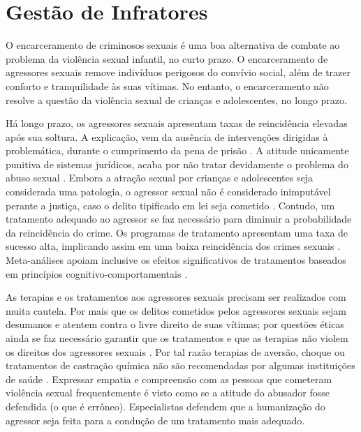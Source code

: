 
\section{Gestão de Infratores}\label{sec:infratores}

O encarceramento de criminosos sexuais é uma boa alternativa de combate ao problema da violência sexual infantil, no curto prazo. O encarceramento de agressores sexuais remove indivíduos perigosos do convívio social, além de trazer conforto e tranquilidade às suas vítimas. No entanto, o encarceramento não resolve a questão da violência sexual de crianças e adolescentes, no longo prazo.  

Há longo prazo, os agressores sexuais apresentam taxas de reincidência elevadas após sua soltura. A explicação, vem da ausência de intervenções dirigidas à problemática, durante o cumprimento da pena de prisão \cite{ribeiro2018programas, finkelhor2009prevention, maia2014castraccao}. A atitude unicamente punitiva de sistemas jurídicos, acaba por não tratar devidamente o problema do abuso sexual \cite{camila2019violencia}. Embora a atração sexual por crianças e adolescentes seja considerada uma patologia, o agressor sexual não é considerado inimputável perante a justiça, caso o delito tipificado em lei seja cometido \cite{ribeiro2018programas}. Contudo, um tratamento adequado ao agressor se faz necessário para diminuir a probabilidade da reincidência do crime. Os programas de tratamento apresentam uma taxa de sucesso alta, implicando assim em uma baixa reincidência dos crimes sexuais \cite{ribeiro2018programas}. Meta-análises apoiam inclusive os efeitos significativos de tratamentos baseados em princípios cognitivo-comportamentais \cite{mendelson2015parent}.

As terapias e os tratamentos aos agressores sexuais precisam ser realizados com muita cautela. Por mais que os delitos cometidos pelos agressores sexuais sejam desumanos e atentem contra o livre direito de suas vítimas; por questões éticas ainda se faz necessário garantir que os tratamentos e que as terapias não violem os direitos dos agressores sexuais \cite{finkelhor2009prevention}. Por tal razão terapias de aversão, choque ou tratamentos de castração química não são recomendadas por algumas instituições de saúde \cite{maia2014castraccao}. Expressar empatia e compreensão com as pessoas que cometeram violência sexual frequentemente é visto como se a atitude do abusador fosse defendida (o que é errôneo). Especialistas defendem que a humanização do agressor seja feita para a condução de um tratamento mais adequado.

